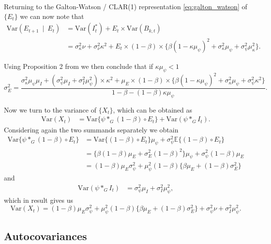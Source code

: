 \documentclass{article}
\begin{document}
Returning to the Galton-Watson / CLAR(1) representation \eqref{eq:galton_watson} of $\{E_t\}$ we can now note that
\begin{align*}
\text{Var}(E_{t + 1} \ \mid \ E_{t}) & = \text{Var}(I^*_t) + E_t \times \text{Var}(B_{k, t})\\
& = \sigma^2_\kappa \nu + \sigma^2_\nu\kappa^2 + E_t \times (1 - \beta) \times \{\beta (1 - \kappa\mu_\psi)^2 + \sigma^2_\kappa\mu_\psi + \sigma^2_\psi\mu_\kappa^2\}.
\end{align*}

Using Proposition 2 from \cite{Grunwald2000} we then conclude that if $\kappa \mu_\psi < 1$
$$
\sigma^2_E = \frac{\sigma^2_\kappa\mu_\psi \mu_I + (\sigma^2_\psi\mu_I + \sigma^2_I\mu_\psi^2)\times\kappa^2 + \mu_E \times (1 - \beta) \times \{\beta (1 - \kappa\mu_\psi)^2 + \sigma^2_\kappa\mu_\psi + \sigma^2_\psi\kappa^2\}}{1 - \beta - (1 - \beta)\kappa\mu_\psi}.
$$

Now we turn to the variance of $\{X_t\}$, which can be obtained as
\begin{align*}
\text{Var}(X_t) & = \text{Var}\{\psi *_G (1 - \beta) \circ E_t\} + \text{Var}(\psi *_G I_t).
\end{align*}
Considering again the two summands separately we obtain
\begin{align*}
\text{Var}\{\psi *_G (1 - \beta) \circ E_t\} & = \text{Var}\{(1 - \beta) \circ E_t\}\mu_\psi + \sigma^2_\psi\mathbb{E}\{(1 - \beta) \circ E_t\}\\
& = \{\beta(1 - \beta)\mu_E + \sigma^2_E(1 - \beta)^2\}\mu_\psi + \sigma^2_\psi(1- \beta)\mu_E\\
& = (1 - \beta)\mu_E \sigma^2_\psi + \mu_\psi^2(1 - \beta)\{\beta\mu_E + (1 - \beta)\sigma^2_E\}
\end{align*}
and
\begin{align*}
\text{Var}(\psi *_G I_t) & = \sigma^2_\psi\mu_I + \sigma^2_I\mu_\psi^2,
\end{align*}
which in result gives us
$$
\text{Var}(X_t) = (1 - \beta)\mu_E \sigma^2_\psi + \mu_\psi^2(1 - \beta)\{\beta\mu_E + (1 - \beta)\sigma^2_E\} + \sigma^2_\psi\nu + \sigma^2_I\mu_\psi^2.
$$

\subsection{Autocovariances}
\end{document}
